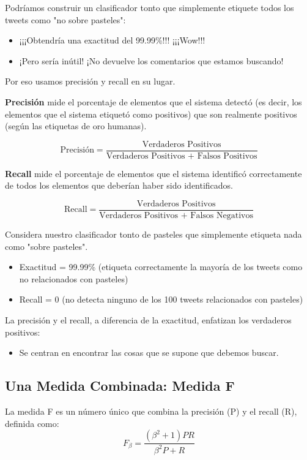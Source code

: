 \documentclass[11pt,fleqn]{book} %
\begin{document}
Podríamos construir un clasificador tonto que simplemente etiquete todos los tweets como "no sobre pasteles":
\begin{itemize}
\item ¡¡¡Obtendría una exactitud del 99.99\%!!! ¡¡¡Wow!!!
\item ¡Pero sería inútil! ¡No devuelve los comentarios que estamos buscando!
\end{itemize}

Por eso usamos precisión y recall en su lugar.


\textbf{Precisión} mide el porcentaje de elementos que el sistema detectó (es decir, los elementos que el sistema etiquetó como positivos) que son realmente positivos (según las etiquetas de oro humanas).

\[
\text{Precisión} = \frac{\text{Verdaderos Positivos}}{\text{Verdaderos Positivos + Falsos Positivos}}
\]

\textbf{Recall} mide el porcentaje de elementos que el sistema identificó correctamente de todos los elementos que deberían haber sido identificados.

\[
\text{Recall} = \frac{\text{Verdaderos Positivos}}{\text{Verdaderos Positivos + Falsos Negativos}}
\]


Considera nuestro clasificador tonto de pasteles que simplemente etiqueta nada como "sobre pasteles".

\begin{itemize}
  \item Exactitud = 99.99\% (etiqueta correctamente la mayoría de los tweets como no relacionados con pasteles)
  \item Recall = 0 (no detecta ninguno de los 100 tweets relacionados con pasteles)
\end{itemize}

La precisión y el recall, a diferencia de la exactitud, enfatizan los verdaderos positivos:
\begin{itemize}
  \item Se centran en encontrar las cosas que se supone que debemos buscar.
\end{itemize}

\subsection{Una Medida Combinada: Medida F}
La medida F es un número único que combina la precisión (P) y el recall (R), definida como:
\[
F_\beta = \frac{(\beta^2+1)PR}{\beta^2P + R}
\]
\end{document}
